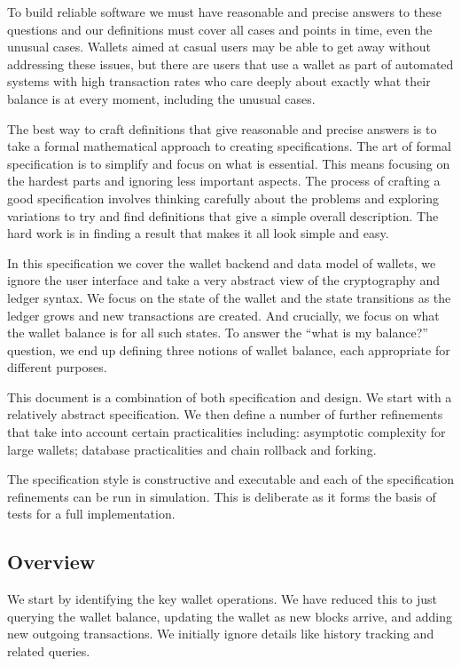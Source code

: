 \documentclass{article}
\theoremstyle{definition}{
  \newtheorem{lemma}{Lemma}[section] %
  \newtheorem{definition}[lemma]{Definition}
}
\theoremstyle{theorem}{
  \newtheorem{invariant}[lemma]{Invariant}
  \newtheorem{proofobligation}[lemma]{Proof Obligation}
}
\numberwithin{equation}{lemma}
\begin{document}
To build reliable software we must have reasonable and precise answers to these
questions and our definitions must cover all cases and points in time, even the
unusual cases. Wallets aimed at casual users may be able to get away without
addressing these issues, but there are users that use a wallet as part of
automated systems with high transaction rates who care deeply about exactly
what their balance is at every moment, including the unusual cases.

The best way to craft definitions that give reasonable and precise answers is
to take a formal mathematical approach to creating specifications. The art of
formal specification is to simplify and focus on what is essential. This means
focusing on the hardest parts and ignoring less important aspects. The process
of crafting a good specification involves thinking carefully about the problems
and exploring variations to try and find definitions that give a simple
overall description. The hard work is in finding a result that makes it all look
simple and easy.

In this specification we cover the wallet backend and data model of wallets,
we ignore the user interface and take a very abstract view of the cryptography
and ledger syntax. We focus on the state of the wallet and the state transitions
as the ledger grows and new transactions are created. And crucially, we focus on
what the wallet balance is for all such states. To answer the ``what is my
balance?'' question, we end up defining three notions of wallet balance, each
appropriate for different purposes.

This document is a combination of both specification and design. We start with
a relatively abstract specification. We then define a number of further
refinements that take into account certain practicalities including: asymptotic
complexity for large wallets; database practicalities and chain rollback and
forking.

The specification style is constructive and executable and each of the
specification refinements can be run in simulation. This is deliberate as
it forms the basis of tests for a full implementation.

\subsection{Overview}

We start by identifying the key wallet operations. We have reduced this to
just querying the wallet balance, updating the wallet as new blocks arrive, and adding
new outgoing transactions. We initially ignore details like history tracking
and related queries.
\end{document}
